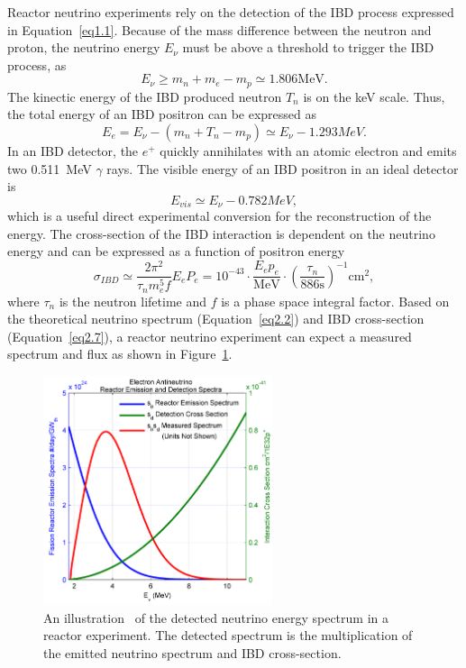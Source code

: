     Reactor neutrino experiments rely on the detection of the IBD process expressed in Equation~\ref{eq1.1}.
    Because of the mass difference between the neutron and proton, the neutrino energy $E_\nu$ must be above a threshold to trigger the IBD process, as
    \begin{equation}\label{eq2.4}
    E_\nu \ge m_n + m_e - m_p \simeq 1.806 \textrm{MeV}.
    \end{equation}
    The kinectic energy of the IBD produced neutron $T_n$ is on the keV scale.
    Thus, the total energy of an IBD positron can be expressed as
    \begin{equation}\label{eq2.5}
    E_e = E_\nu - (m_n + T_n - m_p) \simeq E_\nu - 1.293 MeV.
    \end{equation}
    In an IBD detector, the $e^+$ quickly annihilates with an atomic electron and emits two 0.511~MeV $\gamma$ rays.
    The visible energy of an IBD positron in an ideal detector is 
    \begin{equation}\label{eq2.6}
    E_{vis} \simeq E_\nu - 0.782 MeV,
    \end{equation}
    which is a useful direct experimental conversion for the reconstruction of the \nuebar energy. 
    The cross-section of the IBD interaction is dependent on the neutrino energy and can be expressed as a function of positron energy
    \begin{equation}\label{eq2.7}
    \sigma_{IBD} \simeq \frac{2\pi^2}{\tau_n m_e^5 f }E_eP_e = 10^{-43}\cdot \frac{E_ep_e}{\textrm{MeV}}\cdot(\frac{\tau_n}{886\textrm{s}})^{-1} \textrm{cm}^2,
    \end{equation} 
    where $\tau_n$ is the neutron lifetime and $f$ is a phase space integral factor.
    Based on the theoretical neutrino spectrum (Equation~\ref{eq2.2}) and IBD cross-section (Equation~\ref{eq2.7}), a reactor neutrino experiment can expect a measured spectrum and flux as shown in Figure~\ref{fig:2.2}.
    \begin{figure}[h!]
    \centering
    \includegraphics[width=0.6\textwidth]{Figures/twoXsections.png}
    \caption[Expectation of detected reactor neutrino spectrum]{An illustration~\cite{bib:Jocher} of the detected neutrino energy spectrum in a reactor experiment. 
    The detected spectrum is the multiplication of the emitted neutrino spectrum and IBD cross-section.}
    \label{fig:2.2}
    \end{figure}      
    
